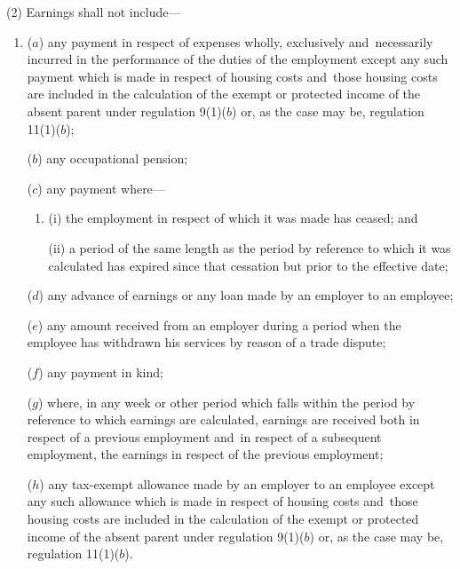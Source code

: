 \documentclass[12pt,a4paper]{article}
\begin{document}
(2) Earnings shall not include—
\begin{enumerate}\item[]
($a$) any payment in respect of expenses wholly, exclusively and~necessarily incurred in the performance of the duties of the employment
except any such payment which is made in respect of housing costs and~those housing costs are included in the calculation of the exempt or protected income of the absent parent under regulation 9(1)($b$) or, as the case may be, regulation 11(1)($b$);  %

($b$) any occupational pension;

($c$) any payment where—
\begin{enumerate}\item[]
(i) the employment in respect of which it was made has ceased; and

(ii) a period of the same length as the period by reference to which it was calculated has expired since that cessation but prior to the effective date;
\end{enumerate}

($d$) any advance of earnings or any loan made by an employer to an employee;

($e$) any amount received from an employer during a period when the employee has withdrawn his services by reason of a trade dispute;

($f$) any payment in kind;

($g$) where, in any week or other period which falls within the period by reference to which earnings are calculated, earnings are received both in respect of a previous employment and~in respect of a subsequent employment, the earnings in respect of the previous employment;

($h$) any tax-exempt allowance made by an employer to an employee
except any such allowance which is made in respect of housing costs and~those housing costs are included in the calculation of the exempt or protected income of the absent parent under regulation 9(1)($b$) or, as the case may be, regulation 11(1)($b$).  %
\end{enumerate}
\end{document}
